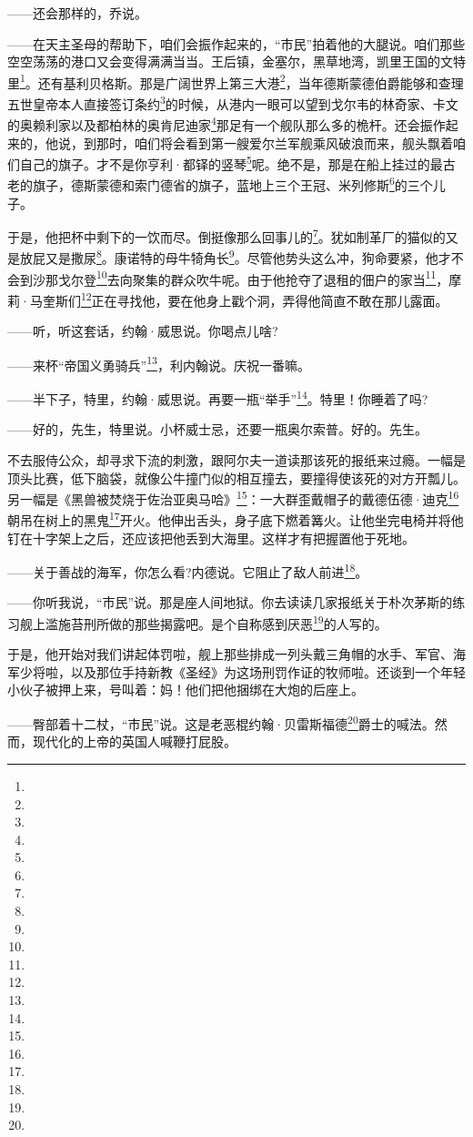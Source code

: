 \par ——还会那样的，乔说。
\par ——在天主圣母的帮助下，咱们会振作起来的，“市民”拍着他的大腿说。咱们那些空空荡荡的港口又会变得满满当当。王后镇，金塞尔，黑草地湾，凯里王国的文特里\footnote{}。还有基利贝格斯。那是广阔世界上第三大港\footnote{}，当年德斯蒙德伯爵能够和查理五世皇帝本人直接签订条约\footnote{}的时候，从港内一眼可以望到戈尔韦的林奇家、卡文的奥赖利家以及都柏林的奥肯尼迪家\footnote{}那足有一个舰队那么多的桅杆。还会振作起来的，他说，到那时，咱们将会看到第一艘爱尔兰军舰乘风破浪而来，舰头飘着咱们自己的旗子。才不是你亨利·都铎的竖琴\footnote{}呢。绝不是，那是在船上挂过的最古老的旗子，德斯蒙德和索门德省的旗子，蓝地上三个王冠、米列修斯\footnote{}的三个儿子。
\par 于是，他把杯中剩下的一饮而尽。倒挺像那么回事儿的\footnote{}。犹如制革厂的猫似的又是放屁又是撒尿\footnote{}。康诺特的母牛犄角长\footnote{}。尽管他势头这么冲，狗命要紧，他才不会到沙那戈尔登\footnote{}去向聚集的群众吹牛呢。由于他抢夺了退租的佃户的家当\footnote{}，摩莉·马奎斯们\footnote{}正在寻找他，要在他身上戳个洞，弄得他简直不敢在那儿露面。
\par ——听，听这套话，约翰·威思说。你喝点儿啥?
\par ——来杯“帝国义勇骑兵”\footnote{}，利内翰说。庆祝一番嘛。
\par ——半下子，特里，约翰·威思说。再要一瓶“举手”\footnote{}。特里！你睡着了吗?
\par ——好的，先生，特里说。小杯威士忌，还要一瓶奥尔索普。好的。先生。
\par 不去服侍公众，却寻求下流的刺激，跟阿尔夫一道读那该死的报纸来过瘾。一幅是顶头比赛，低下脑袋，就像公牛撞门似的相互撞去，要撞得使该死的对方开瓢儿。另一幅是《黑兽被焚烧于佐治亚奥马哈》\footnote{}：一大群歪戴帽子的戴德伍德·迪克\footnote{}朝吊在树上的黑鬼\footnote{}开火。他伸出舌头，身子底下燃着篝火。让他坐完电椅并将他钉在十字架上之后，还应该把他丢到大海里。这样才有把握置他于死地。
\par ——关于善战的海军，你怎么看?内德说。它阻止了敌人前进\footnote{}。
\par ——你听我说，“市民”说。那是座人间地狱。你去读读几家报纸关于朴次茅斯的练习舰上滥施苔刑所做的那些揭露吧。是个自称感到厌恶\footnote{}的人写的。
\par 于是，他开始对我们讲起体罚啦，舰上那些排成一列头戴三角帽的水手、军官、海军少将啦，以及那位手持新教《圣经》为这场刑罚作证的牧师啦。还谈到一个年轻小伙子被押上来，号叫着：妈！他们把他捆绑在大炮的后座上。
\par ——臀部着十二杖，“市民”说。这是老恶棍约翰·贝雷斯福德\footnote{}爵士的喊法。然而，现代化的上帝的英国人喊鞭打屁股。
